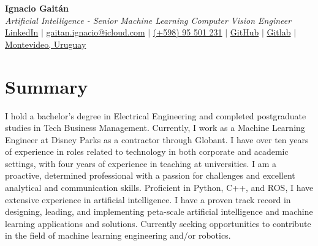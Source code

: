\documentclass[letterpaper,11pt]{article}
\begin{document}
\begin{center}
    \textbf{\LARGE Ignacio Gaitán} \\ \vspace{2ex}
    \textit{Artificial Intelligence - Senior Machine Learning Computer Vision Engineer} \\ \vspace{2ex}
    \small
    \faLinkedinSquare \hspace{.5pt} \href{https://www.linkedin.com/in/ignacio-gaitan}{LinkedIn}
    $|$
    \faAt \hspace{.5pt} \href{mailto:gaitan.ignacio@icloud.com}{gaitan.ignacio@icloud.com}
    $|$
    \faMobile \hspace{.5pt} \href{tel:+59895501231}{(+598) 95 501 231}
    $|$
    \faGithub \hspace{.5pt} \href{https://github.com/gaitanignacio}{GitHub}
    $|$
    \faGithub \hspace{.5pt} \href{https://gitlab.com/gaitan.ignacio}{Gitlab}
    $|$
    \faMapMarker \hspace{.5pt} \href{https://www.google.com/maps/place/Prof.+Juan+Carlos+Sabat+Pebet+1234,+11300+Montevideo,+Departamento+de+Montevideo,+Uruguay/@-34.9044985,-56.1366609,17z/data=!3m1!4b1!4m6!3m5!1s0x959f813e56b3cedd:0x5a415e79543b2770!8m2!3d-34.9044985!4d-56.134086!16s%2Fg%2F11pysbccyt?entry=ttu}{Montevideo, Uruguay}
\end{center}

\vspace{-2ex}

\section*{Summary}
I hold a bachelor's degree in Electrical Engineering and completed postgraduate studies in Tech Business Management. Currently, I work as a Machine Learning Engineer at Disney Parks as a contractor through Globant. I have over ten years of experience in roles related to technology in both corporate and academic settings, with four years of experience in teaching at universities. I am a proactive, determined professional with a passion for challenges and excellent analytical and communication skills. Proficient in Python, C++, and ROS, I have extensive experience in artificial intelligence. I have a proven track record in designing, leading, and implementing peta-scale artificial intelligence and machine learning applications and solutions. Currently seeking opportunities to contribute in the field of machine learning engineering and/or robotics.
\end{document}
